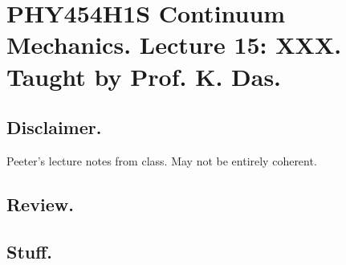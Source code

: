 
%

\chapter{PHY454H1S Continuum Mechanics.  Lecture 15: XXX.  Taught by Prof. K. Das.}
\label{chap:continuumL15}
{}
\date{Mar 9, 2012}

\beginArtWithToc

\section{Disclaimer.}

Peeter's lecture notes from class.  May not be entirely coherent.

\section{Review.}

\section{Stuff.}


\EndArticle
